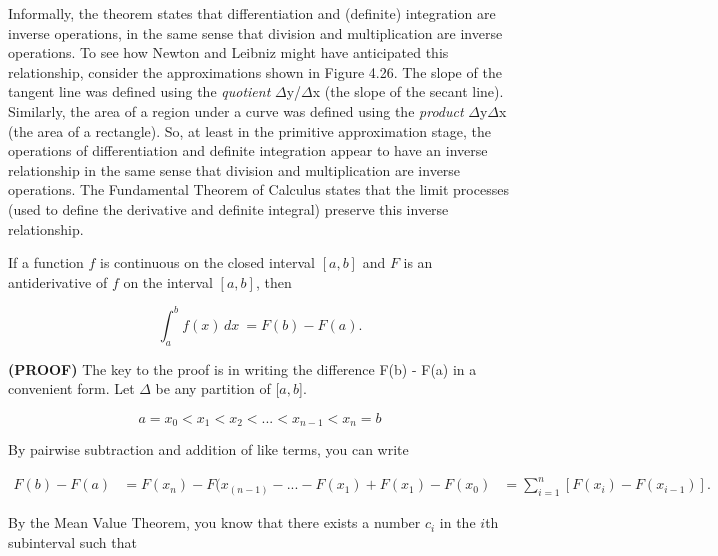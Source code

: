 \documentclass[oneside]{book}
\begin{document}
Informally, the theorem states that differentiation and (definite) integration are inverse operations, in the same sense that division and multiplication are inverse operations. To see how Newton and Leibniz might have anticipated this relationship, consider the approximations shown in Figure 4.26. The slope of the tangent line was defined using the \textit{quotient} $\Delta$y/$\Delta$x (the slope of the secant line). Similarly, the area of a region under a curve was defined using the \textit{product} $\Delta$y$\Delta$x (the area of a rectangle). So, at least in the primitive approximation stage, the operations of differentiation and definite integration appear to have an inverse relationship in the same sense that division and multiplication are inverse operations. The Fundamental Theorem of Calculus states that the limit processes (used to define the derivative and definite integral) preserve this inverse relationship.

\bigskip 
 
\begin{tcolorbox}[colback = white!5!white, 
				  colframe = myblue,
				  colbacktitle = white!5!white,
				  drop shadow southeast, 
				  enhanced,
				  sharp corners = all, 
title =\color{myblue}\textbf{THEOREM 4.9 \color{black} THE FUNDAMENTAL THEOREM OF CALCULUS}]
If a function $f$ is continuous on the closed interval $[a,b]$ and $F$ is an antiderivative of $f$ on the interval $[a,b]$, then

$$ \int_{a}^{b} f(x) \,dx \ = F(b) - F(a).$$ 

\end{tcolorbox}

\bigskip
\color{myblue}
\noindent \textbf{(PROOF)} \color{black} \hspace{.2cm} The key to the proof is in writing the difference F(b) - F(a) in a convenient form. Let $\Delta$ be any partition of [$a, b$].

$$ a = x_0 < x_1 < x_2 < ... < x_{n-1} < x_n = b $$

\noindent By pairwise subtraction and addition of like terms, you can write

\begin{align*}
F(b) - F(a) &= F(x_n) - F(x_(n-1) - ... - F(x_1) + F(x_1) - F(x_0)
&= \sum_{i=1}^{n} [F(x_i) - F(x_{i-1})].
\end{align*}

\noindent By the Mean Value Theorem, you know that there exists a number $c_i$ in the $i$th subinterval such that
\end{document}
